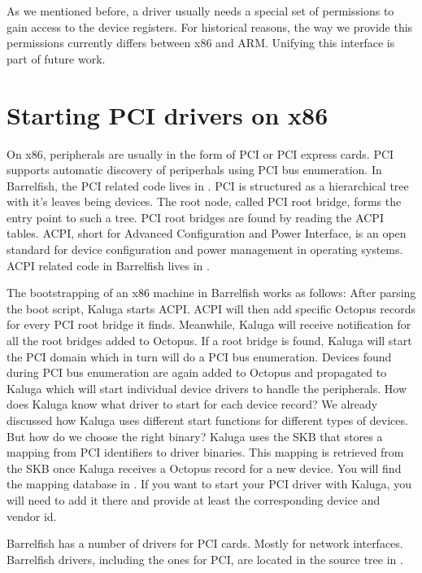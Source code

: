 \documentclass[a4paper,11pt,twoside]{report}
\begin{document}
As we mentioned before, a driver usually needs a special set of permissions to
gain access to the device registers. For historical reasons, the way we
provide this permissions currently differs between x86 and ARM. Unifying this
interface is part of future work.

\section{Starting PCI drivers on x86}
\label{sec:pcidriverstart}

On x86, peripherals are usually in the form of PCI or PCI express cards. PCI
supports automatic discovery of periperhals using PCI bus enumeration. In
Barrelfish, the PCI related code lives in . PCI is
structured as a hierarchical tree with it's leaves being devices. The root
node, called PCI root bridge, forms the entry point to such a tree. PCI root
bridges are found by reading the ACPI tables. ACPI, short for Advanced
Configuration and Power Interface, is an open standard for device
configuration and power management in operating systems. ACPI related code in
Barrelfish lives in .

The bootstrapping of an x86 machine in Barrelfish works as follows: After
parsing the boot script, Kaluga starts ACPI. ACPI will then add specific
Octopus records for every PCI root bridge it finds. Meanwhile, Kaluga will
receive notification for all the root bridges added to Octopus. If a root
bridge is found, Kaluga will start the PCI domain which in turn will do a PCI
bus enumeration. Devices found during PCI bus enumeration are again added to
Octopus and propagated to Kaluga which will start individual device drivers to
handle the peripherals. How does Kaluga know what driver to start for each
device record? We already discussed how Kaluga uses different start functions
for different types of devices. But how do we choose the right binary? Kaluga
uses the SKB that stores a mapping from PCI identifiers to driver binaries. This
mapping is retrieved from the SKB once Kaluga receives a Octopus record for a
new device. You will find the mapping database in
. If you want to start your PCI driver
with Kaluga, you will need to add it there and provide at least the
corresponding device and vendor id.

Barrelfish has a number of drivers for PCI cards. Mostly for network
interfaces. Barrelfish drivers, including the ones for PCI, are located in the
source tree in .
\end{document}
